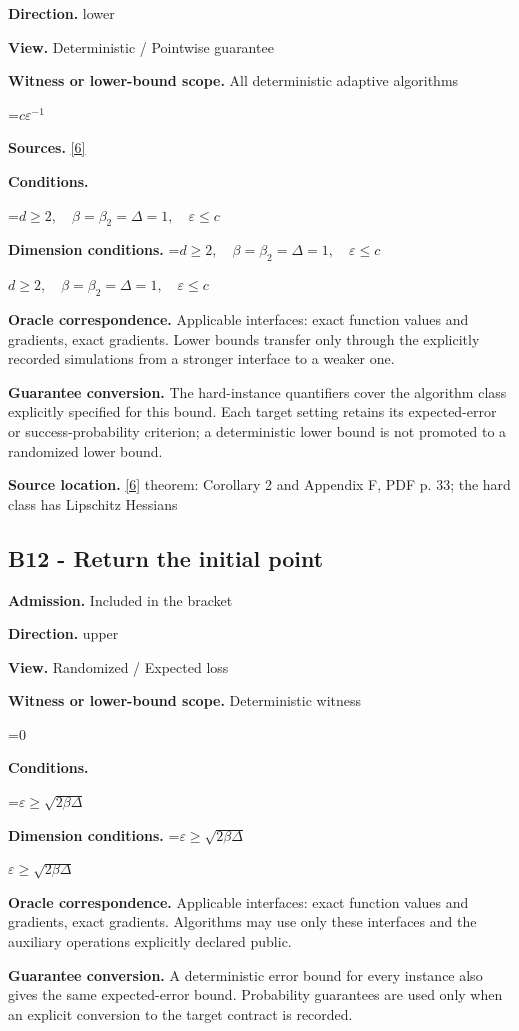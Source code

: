 \documentclass[10pt,a4paper]{article}
\newcommand{\AtlasMath}[1]{\par\begingroup\centering\setbox0=\hbox{$\displaystyle #1$}\ifdim\wd0>1.4\linewidth\typeout{ATLAS WIDE FORMULA: \the\wd0}\fi\ifdim\wd0>\linewidth\resizebox{\linewidth}{!}{\box0}\else\box0\fi\par\endgroup}
\newcommand{\AtlasInlineMath}[1]{\begingroup\setbox0=\hbox{$#1$}\ifdim\wd0>.4\linewidth\endgroup\AtlasMath{#1}\else\endgroup$#1$\fi}
\begin{document}
\textbf{Direction.} lower

\textbf{View.} Deterministic / Pointwise guarantee

\textbf{Witness or lower-bound scope.} All deterministic adaptive algorithms

\AtlasMath{c\varepsilon^{-1}}
\textbf{Sources.} \href{https://proceedings.mlr.press/v235/kontogiannis24a.html}{[6]}

\textbf{Conditions.} 
\AtlasMath{d\ge2,\quad\beta=\beta_2=\Delta=1,\quad\varepsilon\le c}


\textbf{Dimension conditions.} \AtlasInlineMath{d\ge2,\quad\beta=\beta_2=\Delta=1,\quad\varepsilon\le c}

\textbf{Oracle correspondence.} Applicable interfaces: exact function values and gradients, exact gradients. Lower bounds transfer only through the explicitly recorded simulations from a stronger interface to a weaker one.

\textbf{Guarantee conversion.} The hard-instance quantifiers cover the algorithm class explicitly specified for this bound. Each target setting retains its expected-error or success-probability criterion; a deterministic lower bound is not promoted to a randomized lower bound.

\textbf{Source location.} \href{https://proceedings.mlr.press/v235/kontogiannis24a.html}{[6]} theorem: Corollary 2 and Appendix F, PDF p. 33; the hard class has Lipschitz Hessians

\subsection{B12 - Return the initial point}
\textbf{Admission.} Included in the bracket

\textbf{Direction.} upper

\textbf{View.} Randomized / Expected loss

\textbf{Witness or lower-bound scope.} Deterministic witness

\AtlasMath{0}
\textbf{Conditions.} 
\AtlasMath{\varepsilon\ge\sqrt{2\beta\Delta}}


\textbf{Dimension conditions.} \AtlasInlineMath{\varepsilon\ge\sqrt{2\beta\Delta}}

\textbf{Oracle correspondence.} Applicable interfaces: exact function values and gradients, exact gradients. Algorithms may use only these interfaces and the auxiliary operations explicitly declared public.

\textbf{Guarantee conversion.} A deterministic error bound for every instance also gives the same expected-error bound. Probability guarantees are used only when an explicit conversion to the target contract is recorded.
\end{document}
